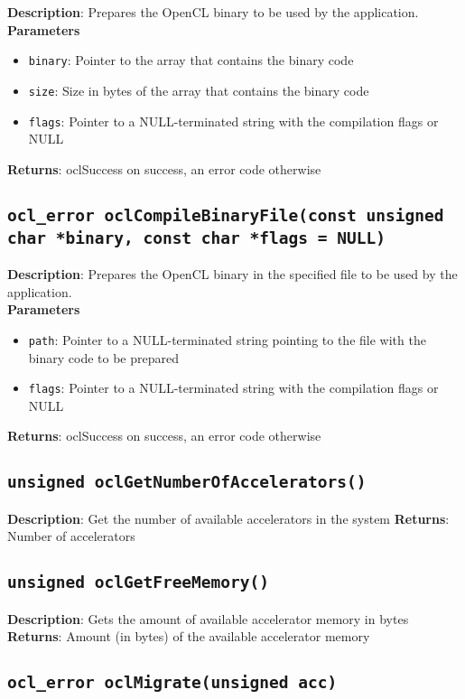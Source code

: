 \textbf{Description}: Prepares the OpenCL binary to be used by the application.  \\
\textbf{Parameters}
\begin{itemize}
  \item \texttt{binary}: Pointer to the array that contains the binary code
  \item \texttt{size}: Size in bytes of the array that contains the binary code
  \item \texttt{flags}: Pointer to a NULL\hyp{}terminated string with the compilation flags or 
NULL
\end{itemize}
\textbf{Returns}: oclSuccess on success, an error code otherwise

\subsection{\texttt{ocl\_error oclCompileBinaryFile(const unsigned char *binary, const char 
*flags = NULL)}}

\textbf{Description}: Prepares the OpenCL binary in the specified file to be used by the application.  \\
\textbf{Parameters}
\begin{itemize}
  \item \texttt{path}: Pointer to a NULL\hyp{}terminated string pointing to the file with the binary 
  code to be prepared
  \item \texttt{flags}: Pointer to a NULL\hyp{}terminated string with the compilation flags or NULL
\end{itemize}
\textbf{Returns}: oclSuccess on success, an error code otherwise

\subsection{\texttt{unsigned oclGetNumberOfAccelerators()}}

\textbf{Description}: Get the number of available accelerators in the system
\textbf{Returns}: Number of accelerators

\subsection{\texttt{unsigned oclGetFreeMemory()}}

\textbf{Description}: Gets the amount of available accelerator memory in bytes
\textbf{Returns}: Amount (in bytes) of the available accelerator memory

\subsection{\texttt{ocl\_error oclMigrate(unsigned acc)}}

